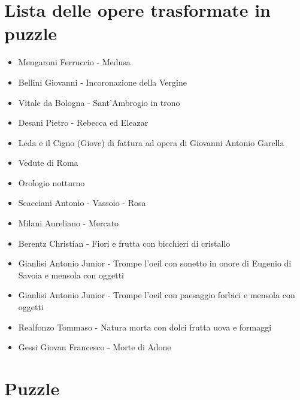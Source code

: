 \documentclass[hidelinks,12pt,a4paper]{article}
\begin{document}
	\section{Lista delle opere trasformate in puzzle}
	\begin{itemize}
		\item Mengaroni Ferruccio - Medusa
		\item Bellini Giovanni - Incoronazione della Vergine
		\item Vitale da Bologna - Sant'Ambrogio in trono
		\item Desani Pietro - Rebecca ed Eleazar
		\item Leda e il Cigno (Giove) di fattura ad opera di Giovanni Antonio Garella
		\item Vedute di Roma
		\item Orologio notturno
		\item Scacciani Antonio - Vassoio - Rosa
		\item Milani Aureliano - Mercato
		\item Berentz Christian - Fiori e frutta con bicchieri di cristallo
		\item Gianlisi Antonio Junior - Trompe l'oeil con sonetto in onore di Eugenio di Savoia e mensola con oggetti
		\item Gianlisi Antonio Junior - Trompe l'oeil con paesaggio forbici e mensola con oggetti
		\item Realfonzo Tommaso - Natura morta con dolci frutta uova e formaggi
		\item Gessi Giovan Francesco - Morte di Adone
	\end{itemize}

	\section{Puzzle}
\end{document}
